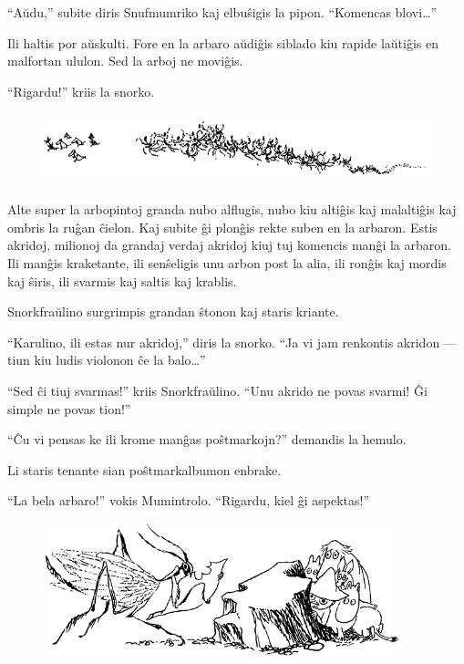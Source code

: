 ``Aŭdu,'' subite diris Snufmumriko kaj elbuŝigis la pipon. ``Komencas blovi{\ldots}''

Ili haltis por aŭskulti. Fore en la arbaro aŭdiĝis siblado kiu rapide laŭtiĝis en malfortan ululon. Sed la arboj ne moviĝis.

``Rigardu!'' kriis la snorko.

\begin{figure}[htbp]
\centering
\includegraphics[width=400pt,height=58pt]{8-4.png}
\caption{}
\label{8-4}
\end{figure}

Alte super la arbopintoj granda nubo alflugis, nubo kiu altiĝis kaj malaltiĝis kaj ombris la ruĝan ĉielon. Kaj subite ĝi plonĝis rekte suben en la arbaron. Estis akridoj, milionoj da grandaj verdaj akridoj kiuj tuj komencis manĝi la arbaron. Ili manĝis kraketante, ili senŝeligis unu arbon post la alia, ili ronĝis kaj mordis kaj ŝiris, ili svarmis kaj saltis kaj krablis.

Snorkfraŭlino surgrimpis grandan ŝtonon kaj staris kriante.

``Karulino, ili estas nur akridoj,'' diris la snorko. ``Ja vi jam renkontis akridon --- tiun kiu ludis violonon ĉe la balo{\ldots}''

``Sed ĉi tiuj svarmas!'' kriis Snorkfraŭlino. ``Unu akrido ne povas svarmi! Ĝi simple ne povas tion!''

``Ĉu vi pensas ke ili krome manĝas poŝtmarkojn?'' demandis la hemulo.

Li staris tenante sian poŝtmarkalbumon enbrake.

``La bela arbaro!'' vokis Mumintrolo. ``Rigardu, kiel ĝi aspektas!''

\begin{figure}[htbp]
\centering
\includegraphics[width=293pt,height=110pt]{8-5.png}
\caption{}
\label{8-5}
\end{figure}

